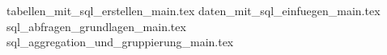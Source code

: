 
{tabellen_mit_sql_erstellen_main.tex}
{daten_mit_sql_einfuegen_main.tex}
{sql_abfragen_grundlagen_main.tex}
{sql_aggregation_und_gruppierung_main.tex}

